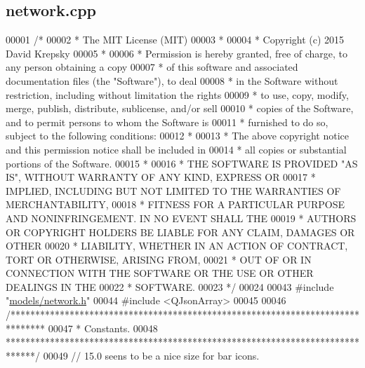 \hypertarget{network_8cpp_source}{}\subsection{network.\+cpp}
\label{network_8cpp_source}

\begin{DoxyCode}
00001 \textcolor{comment}{/*}
00002 \textcolor{comment}{ * The MIT License (MIT)}
00003 \textcolor{comment}{ *}
00004 \textcolor{comment}{ * Copyright (c) 2015 David Krepsky}
00005 \textcolor{comment}{ *}
00006 \textcolor{comment}{ * Permission is hereby granted, free of charge, to any person obtaining a copy}
00007 \textcolor{comment}{ * of this software and associated documentation files (the "Software"), to deal}
00008 \textcolor{comment}{ * in the Software without restriction, including without limitation the rights}
00009 \textcolor{comment}{ * to use, copy, modify, merge, publish, distribute, sublicense, and/or sell}
00010 \textcolor{comment}{ * copies of the Software, and to permit persons to whom the Software is}
00011 \textcolor{comment}{ * furnished to do so, subject to the following conditions:}
00012 \textcolor{comment}{ *}
00013 \textcolor{comment}{ * The above copyright notice and this permission notice shall be included in}
00014 \textcolor{comment}{ * all copies or substantial portions of the Software.}
00015 \textcolor{comment}{ *}
00016 \textcolor{comment}{ * THE SOFTWARE IS PROVIDED "AS IS", WITHOUT WARRANTY OF ANY KIND, EXPRESS OR}
00017 \textcolor{comment}{ * IMPLIED, INCLUDING BUT NOT LIMITED TO THE WARRANTIES OF MERCHANTABILITY,}
00018 \textcolor{comment}{ * FITNESS FOR A PARTICULAR PURPOSE AND NONINFRINGEMENT. IN NO EVENT SHALL THE}
00019 \textcolor{comment}{ * AUTHORS OR COPYRIGHT HOLDERS BE LIABLE FOR ANY CLAIM, DAMAGES OR OTHER}
00020 \textcolor{comment}{ * LIABILITY, WHETHER IN AN ACTION OF CONTRACT, TORT OR OTHERWISE, ARISING FROM,}
00021 \textcolor{comment}{ * OUT OF OR IN CONNECTION WITH THE SOFTWARE OR THE USE OR OTHER DEALINGS IN THE}
00022 \textcolor{comment}{ * SOFTWARE.}
00023 \textcolor{comment}{ */}
00024 
00043 \textcolor{preprocessor}{#include "\hyperlink{network_8h}{models/network.h}"}
00044 \textcolor{preprocessor}{#include <QJsonArray>}
00045 
00046 \textcolor{comment}{/*******************************************************************************}
00047 \textcolor{comment}{ * Constants.}
00048 \textcolor{comment}{ ******************************************************************************/}
00049 \textcolor{comment}{// 15.0 seens to be a nice size for bar icons.}

\end{DoxyCode}
